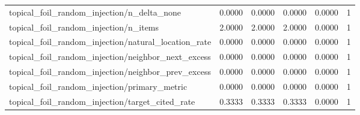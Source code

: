 \begin{table}[h]
\begin{tabular}{lrrrrr}
topical_foil_random_injection/n_delta_none & 0.0000 & 0.0000 & 0.0000 & 0.0000 & 1 \\
topical_foil_random_injection/n_items & 2.0000 & 2.0000 & 2.0000 & 0.0000 & 1 \\
topical_foil_random_injection/natural_location_rate & 0.0000 & 0.0000 & 0.0000 & 0.0000 & 1 \\
topical_foil_random_injection/neighbor_next_excess & 0.0000 & 0.0000 & 0.0000 & 0.0000 & 1 \\
topical_foil_random_injection/neighbor_prev_excess & 0.0000 & 0.0000 & 0.0000 & 0.0000 & 1 \\
topical_foil_random_injection/primary_metric & 0.0000 & 0.0000 & 0.0000 & 0.0000 & 1 \\
topical_foil_random_injection/target_cited_rate & 0.3333 & 0.3333 & 0.3333 & 0.0000 & 1 \\
\hline
\end{tabular}
\end{table}